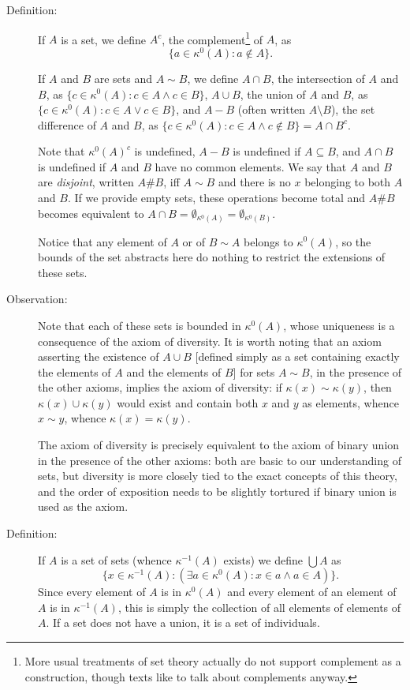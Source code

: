 \documentclass[12pt]{article}
\begin{document}
\begin{description}

\item[Definition:]  If $A$ is a set, we define $A^c$, the complement\footnote{More usual treatments of set theory actually do not support complement as a construction, though texts like to talk about complements anyway.} of $A$, as $$\{a \in \kappa^0(A):a \not\in A\}.$$

If $A$ and $B$ are sets and $A \sim B$, we define $A \cap B$, the intersection of $A$ and $B$, as $\{c \in \kappa^0(A):c \in A \wedge c \in B\}$,
$A \cup B$, the union of $A$ and $B$,  as $\{c \in \kappa^0(A):c \in A \vee c \in B\}$, and $A-B$ (often written $A \setminus B$), the set difference of $A$ and $B$,  as $\{c \in \kappa^0(A):c \in A \wedge c \not\in B\} = A \cap B^c$.

Note that $\kappa^0(A)^c$ is undefined, $A-B$ is undefined if $A \subseteq B$, and $A \cap B$ is undefined if $A$ and $B$ have no common elements.
We say that $A$ and $B$ are {\em disjoint\/}, written $A \# B$, iff $A \sim B$ and there is no $x$ belonging to both $A$ and $B$.  If we provide empty sets, these operations become total and $A \#B$ becomes equivalent to $A \cap B = \emptyset_{\kappa^0(A)}=  \emptyset_{\kappa^0(B)}$.

Notice that any element of $A$ or of $B \sim A$ belongs to $\kappa^0(A)$, so the bounds of the set abstracts  here do nothing to restrict the extensions of these sets.

\item[Observation:]  Note that each of these sets is bounded in $\kappa^0(A)$, whose uniqueness is a consequence 
of the axiom of diversity.  It is worth noting that an axiom asserting the existence of $A \cup B$ [defined simply as a set containing exactly the elements of $A$ and the elements of $B$] for sets $A \sim B$, in the presence of the other axioms, implies the axiom of diversity:  if $\kappa(x) \sim \kappa(y)$, then $\kappa(x) \cup \kappa(y)$ would exist and contain both $x$ and $y$ as elements, whence $x \sim y$, whence $\kappa(x)=\kappa(y)$.

The axiom of diversity is precisely equivalent to the axiom of binary union in the presence of the other axioms:  both are basic to our understanding of sets, but diversity is more closely tied to the exact concepts of this theory, and the order of exposition needs to be slightly tortured if binary union is used as the axiom.

\item[Definition:]   If $A$ is a set of sets (whence $\kappa^{-1}(A)$ exists) we define $\bigcup A$ as $$\{x \in \kappa^{-1}(A):(\exists a \in \kappa^0(A):x \in a \wedge a \in A)\}.$$  Since every element of $A$ is in $\kappa^0(A)$ and every element of an element of $A$ is in $\kappa^{-1}(A)$, this is simply the collection of all elements of elements of $A$.
If a set does not have a union, it is a set of individuals.


\end{description}
\end{document}
